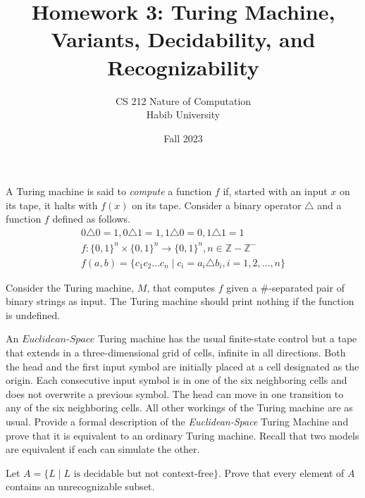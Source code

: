 \documentclass[addpoints,a4paper]{exam}
\title{Homework 3: Turing Machine, Variants, Decidability, and Recognizability}
\author{CS 212 Nature of Computation\\Habib University}
\date{Fall 2023}
\begin{document}
\maketitle

\begin{questions}

\question \label{q:lang} A Turing machine is said to \textit{compute} a function $f$ if, started with an input $x$ on its tape, it halts with $f(x)$ on its tape. Consider a binary operator $\triangle$ and a function $f$ defined as follows.
  \begin{align*}
    0\triangle 0=1, 0\triangle 1=1, 1\triangle 0=0,1\triangle 1=1\\
    f:\{0,1\}^n\times \{0,1\}^n\to \{0,1\}^n, n\in \mathbb{Z}-\mathbb{Z}^-    \\
    f(a,b) = \{ c_1c_2\ldots c_n \mid c_i = a_i\triangle b_i, i = 1,2,\ldots,n\}
  \end{align*}

Consider the Turing machine, $M$, that computes $f$ given a $\#$-separated pair of binary strings as input. The Turing machine should print nothing if the function is undefined.


\question [10] An $\textit{Euclidean-Space}$ Turing machine has the usual finite-state control but a tape that extends in a three-dimensional grid of cells, infinite in all directions. Both the head and the first input symbol are initially placed at a cell designated as the origin. Each consecutive input symbol is in one of the six neighboring cells and does not overwrite a previous symbol. The head can move in one transition to any of the six neighboring cells. All other workings of the Turing machine are as usual. Provide a formal description of the \textit{Euclidean-Space} Turing Machine and prove that it is equivalent to an ordinary Turing machine. Recall that two models are equivalent if each can simulate the other.
  
\question [10] Let $A = \{L \mid L\text{ is decidable but not context-free}\}$. Prove that every element of $A$ contains an unrecognizable subset.


\end{questions}
\end{document}
